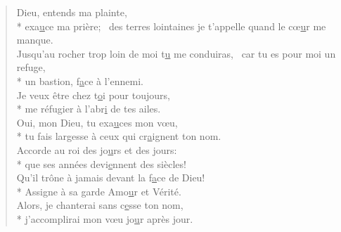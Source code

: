 
\begin{verse}
Dieu, entends ma plainte, \\*
exa\underline{u}ce ma prière;~\psalmstar
{}des terres lointaines je t’appelle
quand le cœ\underline{u}r me manque. \\

Jusqu’au rocher trop loin de moi
t\underline{u} me conduiras,~\psalmstar
{}car tu es pour moi un refuge, \\*
un bastion, f\underline{a}ce à l’ennemi. \\

Je veux être chez t\underline{o}i pour toujours, \\*
me réfugier à l’abr\underline{i} de tes ailes. \\

Oui, mon Dieu, tu exa\underline{u}ces mon vœu, \\*
tu fais largesse à ceux qui cr\underline{a}ignent ton nom. \\

Accorde au roi des jo\underline{u}rs et des jours: \\*
que ses années devi\underline{e}nnent des siècles! \\

Qu’il trône à jamais devant la f\underline{a}ce de Dieu! \\*
Assigne à sa garde Amo\underline{u}r et Vérité. \\

Alors, je chanterai sans c\underline{e}sse ton nom, \\*
j’accomplirai mon vœu jo\underline{u}r après jour. \\
\end{verse}

